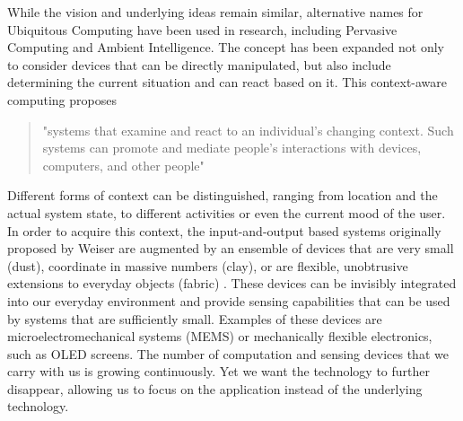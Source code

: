 While the vision and underlying ideas remain similar, alternative names for Ubiquitous Computing have been used in research, including Pervasive Computing and Ambient Intelligence. The concept has been expanded not only to consider devices that can be directly manipulated, but also include determining the current situation and can react based on it. This context-aware computing proposes 
\begin{quote}
"systems that examine and react to an individual's changing context. Such systems can promote and mediate people's interactions with devices, computers, and other people" \cite{schilit1994context} 
\end{quote}
Different forms of context can be distinguished, ranging from location and the actual system state, to different activities or even the current mood of the user. In order to acquire this context, the input-and-output based systems originally proposed by Weiser are augmented by an ensemble of devices that are very small (dust), coordinate in massive numbers (clay), or are flexible, unobtrusive extensions to everyday objects (fabric) \cite{poslad2011ubiquitous}. These devices can be invisibly integrated into our everyday environment and provide sensing capabilities that can be used by systems that are sufficiently small. Examples of these devices are microelectromechanical systems (MEMS) or mechanically flexible electronics, such as OLED screens. The number of computation and sensing devices that we carry with us is growing continuously. Yet we want the technology to further disappear, allowing us to focus on the application instead of the underlying technology. 

